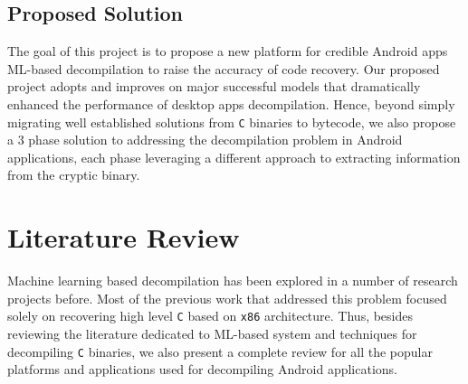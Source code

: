 \documentclass{article}
\begin{document}
\subsection{Proposed Solution}
The goal of this project is to propose a new platform for credible Android apps ML-based decompilation to raise the accuracy of code recovery.
Our proposed project adopts and improves on major successful models that dramatically enhanced the performance of desktop apps decompilation.
Hence, beyond simply migrating well established solutions from \verb|C| binaries to bytecode, we also propose a 3 phase solution to addressing the decompilation problem in Android applications, each phase leveraging a different approach to extracting information from the cryptic binary.

\section{Literature Review}
Machine learning based decompilation has been explored in a number of research projects before.
Most of the previous work that addressed this problem focused solely on recovering high level \verb|C| based on \verb|x86| architecture.
Thus, besides reviewing the literature dedicated to ML-based system and techniques for decompiling \verb|C| binaries, we also present a complete review for all the popular platforms and applications used for decompiling Android applications. \\\\
\end{document}
